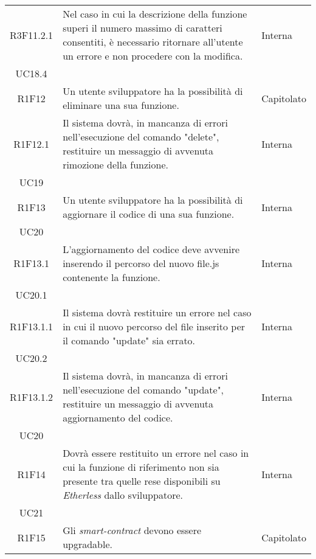 \begin{longtable}{|c|p{8cm}|C{2cm}|}
	R3F11.2.1 &  Nel caso in cui la descrizione della funzione superi il numero massimo di caratteri consentiti, è necessario ritornare all'utente un errore e non procedere con la modifica. & \centering Interna \\ UC18.4 \tabularnewline

	R1F12 &  Un utente sviluppatore ha la possibilità di eliminare una sua funzione. & Capitolato \\

	R1F12.1 & Il sistema dovrà, in mancanza di errori nell'esecuzione del comando "delete", restituire un messaggio di avvenuta rimozione della funzione. & \centering Interna \\ UC19 \tabularnewline

	R1F13 &  Un utente sviluppatore ha la possibilità di aggiornare il codice di una sua funzione. & \centering Interna \\ UC20 \tabularnewline

	R1F13.1 &  L'aggiornamento del codice deve avvenire inserendo il percorso del nuovo file.js contenente la funzione. & \centering Interna \\ UC20.1 \tabularnewline

	R1F13.1.1 & Il sistema dovrà restituire un errore nel caso in cui il nuovo percorso del file inserito per il comando "update" sia errato. & \centering Interna \\ UC20.2 \tabularnewline

	R1F13.1.2 & Il sistema dovrà, in mancanza di errori nell'esecuzione del comando "update", restituire un messaggio di avvenuta aggiornamento del codice. & \centering Interna \\ UC20 \tabularnewline



	R1F14 &  Dovrà essere restituito un errore nel caso in cui la funzione di riferimento non sia presente tra quelle rese disponibili su \textit{Etherless} dallo sviluppatore. & \centering Interna \\ UC21 \tabularnewline

	R1F15 & Gli \textit{smart-contract\glo} devono essere upgradable. & Capitolato \\
	\hline

\end{longtable}
